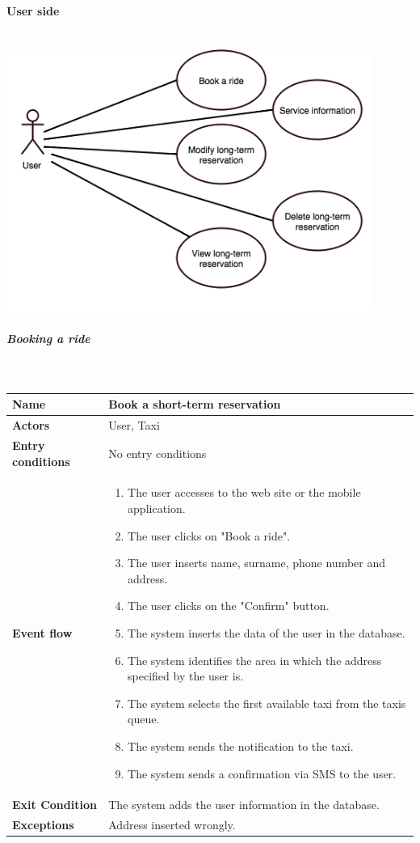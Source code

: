 		\newpage
		\paragraph{User side}
			\begin{center}
			~\\
		\includegraphics[width=0.90\textwidth]{./images/UseCaseUser.png}~
			\end{center}
		\newpage
		\subparagraph{Booking a ride}
		~\\[0.2cm]
			\vspace{20pt}
		\noindent
		
		\begin{tabular}{l l}
		 \textbf {Name} & Book a short-term reservation  \\ \hline
		 \textbf{Actors} & User, Taxi \\ \hline
		 \textbf{Entry conditions} & No entry conditions \\ \hline
		 \textbf{Event flow} & 
		 \parbox{0.7\textwidth}{
		 \begin{enumerate}
		 \item The user accesses to the web site or the mobile application.
		 \item The user clicks on "Book a ride".
		 \item The user inserts name, surname, phone number and address.
		 \item The user clicks on the "Confirm" button.
		 \item The system inserts the data of the user in the database.
		 \item The system identifies the area in which the address specified by the user is.
		 \item The system selects the first available taxi from the taxis queue.
		 \item The system sends the notification to the taxi.
		 \item The system sends a confirmation via SMS to the user.
		 \end{enumerate}
		 } \\ \hline
		 \textbf{Exit Condition} & \parbox{0.7\textwidth}{ The system adds the user information in the database.}\\ \hline
		 \textbf{Exceptions} & Address inserted wrongly.
		\end{tabular}
		
